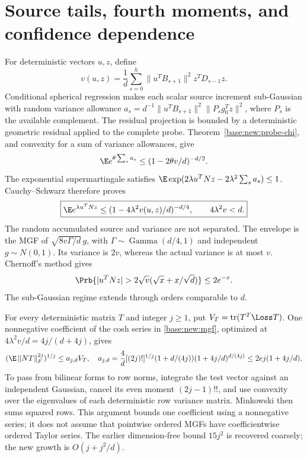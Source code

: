 \documentclass[11pt,oneside,openany,a4paper]{book}
\numberwithin{equation}{chapter}
\theoremstyle{definition}
\theoremstyle{remark}
\newcommand{\F}[1]{\left\lVert#1\right\rVert_F}
\DeclareMathOperator{\tr}{tr}\DeclareMathOperator{\rank}{rank}
\begin{document}
\section{Source tails, fourth moments, and confidence dependence}\label{base:new:source-moments}
For deterministic vectors $u,z$, define
\[
 v(u,z)=\frac1d\sum_{s=0}^{h}\|u^TB_{s+1}\|^2z^TD_{s-1}z.
\]
Conditional spherical regression makes each scalar source increment sub-Gaussian with random variance allowance
$a_s=d^{-1}\|u^TB_{s+1}\|^2\|P_sg_0^Tz\|^2$, where $P_s$ is the available complement. The residual projection is bounded by a deterministic geometric residual applied to the complete probe. Theorem~\ref{base:new:probe-chi}, and convexity for a sum of variance allowances, give
\[
 \E e^{\theta\sum_s a_s}\le(1-2\theta v/d)^{-d/2}.
\]
The exponential supermartingale satisfies
$\E\exp(2\lambda u^TNz-2\lambda^2\sum_sa_s)\le1$.
Cauchy--Schwarz therefore proves
\begin{equation}\label{base:new:mgf}
 \boxed{\E e^{\lambda u^TNz}\le
 (1-4\lambda^2v(u,z)/d)^{-d/4},\qquad4\lambda^2v<d.}
\end{equation}
The random accumulated source and variance are not separated. The envelope is the MGF of $\sqrt{8v\Gamma/d}\,g$, with $\Gamma\sim\operatorname{Gamma}(d/4,1)$ and independent $g\sim N(0,1)$. Its variance is $2v$, whereas the actual variance is at most $v$. Chernoff's method gives
\begin{equation}\label{base:new:source-tail}
 \Prb\{|u^TNz|>2\sqrt v(\sqrt x+x/\sqrt d)\}\le2e^{-x}.
\end{equation}
The sub-Gaussian regime extends through orders comparable to $d$.

For every deterministic matrix $T$ and integer $j\ge1$, put $V_T=\tr(T^T\Loss T)$. One nonnegative coefficient of the cosh series in \eqref{base:new:mgf}, optimized at $4\lambda^2v/d=4j/(d+4j)$, gives
\begin{equation}\label{base:new:source-allmom}
 (\E\F{NT}^{2j})^{1/j}\le a_{j,d}V_T,
\quad
 a_{j,d}=\frac4d[(2j)!]^{1/j}
 (1+d/(4j))(1+4j/d)^{d/(4j)}
 \le2ej(1+4j/d).
\end{equation}
To pass from bilinear forms to row norms, integrate the test vector against an independent Gaussian, cancel its even moment $(2j-1)!!$, and use convexity over the eigenvalues of each deterministic row variance matrix. Minkowski then sums squared rows. This argument bounds one coefficient using a nonnegative series; it does not assume that pointwise ordered MGFs have coefficientwise ordered Taylor series. The earlier dimension-free bound $15j^2$ is recovered coarsely; the new growth is $O(j+j^2/d)$.
\end{document}
